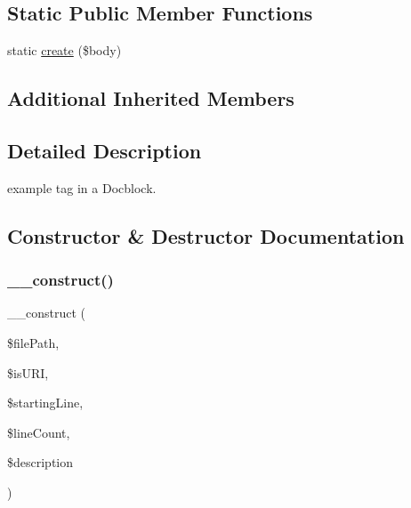 \subsection*{Static Public Member Functions}
\begin{DoxyCompactItemize}
\item 
static \mbox{\hyperlink{classphp_documentor_1_1_reflection_1_1_doc_block_1_1_tags_1_1_example_a322bfa4cad4fbe7364f4ab65c8f8588c}{create}} (\$body)
\end{DoxyCompactItemize}
\subsection*{Additional Inherited Members}


\subsection{Detailed Description}
example tag in a Docblock. 

\subsection{Constructor \& Destructor Documentation}
\mbox{\label{classphp_documentor_1_1_reflection_1_1_doc_block_1_1_tags_1_1_example_a0954927c3e2a4fb1c2329b887db4c1f3}} 
\subsubsection{\texorpdfstring{\+\_\+\+\_\+construct()}{\_\_construct()}}
{\footnotesize\ttfamily \+\_\+\+\_\+construct (\begin{DoxyParamCaption}\item[{}]{\$file\+Path,  }\item[{}]{\$is\+U\+RI,  }\item[{}]{\$starting\+Line,  }\item[{}]{\$line\+Count,  }\item[{}]{\$description }\end{DoxyParamCaption})}



